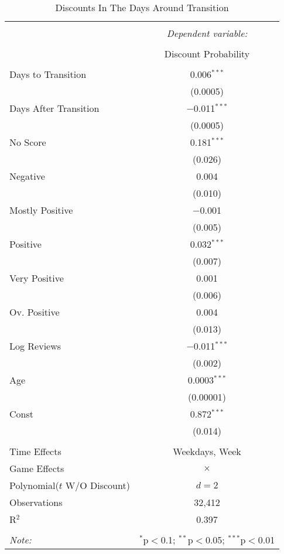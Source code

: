 \documentclass[12pt,pagebackref]{article}
\begin{document}
\begin{table}[hp] \centering    \caption{Discounts In The Days Around Transition}    \label{transitionReg}  \begin{tabular}{@{\extracolsep{5pt}}lc}  \\[-1.8ex]\hline  \hline \\[-1.8ex]   & \multicolumn{1}{c}{\textit{Dependent variable:}} \\  \cline{2-2}  \\[-1.8ex] & Discount Probability \\  \hline \\[-1.8ex]   Days to Transition & 0.006$^{***}$ \\    & (0.0005) \\    Days After Transition & $-$0.011$^{***}$ \\    & (0.0005) \\    No Score & 0.181$^{***}$ \\    & (0.026) \\    Negative & 0.004 \\    & (0.010) \\    Mostly Positive & $-$0.001 \\    & (0.005) \\    Positive & 0.032$^{***}$ \\    & (0.007) \\    Very Positive & 0.001 \\    & (0.006) \\    Ov. Positive & 0.004 \\    & (0.013) \\    Log Reviews & $-$0.011$^{***}$ \\    & (0.002) \\    Age & 0.0003$^{***}$ \\    & (0.00001) \\    Const & 0.872$^{***}$ \\    & (0.014) \\   \hline \\[-1.8ex]  Time Effects & Weekdays, Week \\ Game Effects & $\times$ \\ Polynomial($t$ W/O Discount) & $d = 2$ \\ Observations & 32,412 \\  R$^{2}$ & 0.397 \\  \hline  \hline \\[-1.8ex]  \textit{Note:}  & \multicolumn{1}{r}{$^{*}$p$<$0.1; $^{**}$p$<$0.05; $^{***}$p$<$0.01} \\  \end{tabular}  \end{table}
\end{document}
